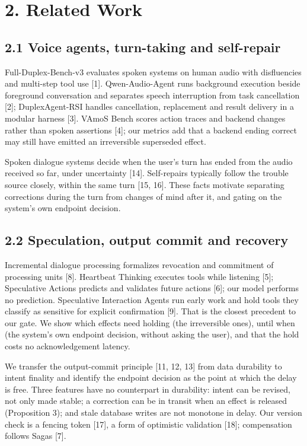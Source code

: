 \documentclass[11pt]{article}
\begin{document}
\section*{2. Related Work}

\subsection*{2.1 Voice agents, turn-taking and self-repair}

Full-Duplex-Bench-v3 evaluates spoken systems on human audio with disfluencies and multi-step tool use [1]. Qwen-Audio-Agent runs background execution beside foreground conversation and separates speech interruption from task cancellation [2]; DuplexAgent-RSI handles cancellation, replacement and result delivery in a modular harness [3]. VAmoS Bench scores action traces and backend changes rather than spoken assertions [4]; our metrics add that a backend ending correct may still have emitted an irreversible superseded effect.


Spoken dialogue systems decide when the user's turn has ended from the audio received so far, under uncertainty [14]. Self-repairs typically follow the trouble source closely, within the same turn [15, 16]. These facts motivate separating corrections during the turn from changes of mind after it, and gating on the system's own endpoint decision.


\subsection*{2.2 Speculation, output commit and recovery}

Incremental dialogue processing formalizes revocation and commitment of processing units [8]. Heartbeat Thinking executes tools while listening [5]; Speculative Actions predicts and validates future actions [6]; our model performs no prediction. Speculative Interaction Agents run early work and hold tools they classify as sensitive for explicit confirmation [9]. That is the closest precedent to our gate. We show which effects need holding (the irreversible ones), until when (the system's own endpoint decision, without asking the user), and that the hold costs no acknowledgement latency.


We transfer the output-commit principle [11, 12, 13] from data durability to intent finality and identify the endpoint decision as the point at which the delay is free. Three features have no counterpart in durability: intent can be revised, not only made stable; a correction can be in transit when an effect is released (Proposition 3); and stale database writes are not monotone in delay. Our version check is a fencing token [17], a form of optimistic validation [18]; compensation follows Sagas [7].
\end{document}
